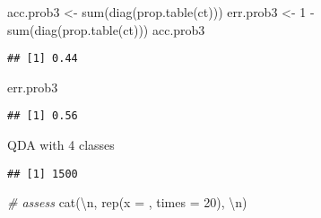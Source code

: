 \documentclass[
]{article}
\newenvironment{Shaded}{\begin{snugshade}}{\end{snugshade}}
\newcommand{\AttributeTok}[1]{\textcolor[rgb]{0.77,0.63,0.00}{#1}}
\newcommand{\CommentTok}[1]{\textcolor[rgb]{0.56,0.35,0.01}{\textit{#1}}}
\newcommand{\DecValTok}[1]{\textcolor[rgb]{0.00,0.00,0.81}{#1}}
\newcommand{\FunctionTok}[1]{\textcolor[rgb]{0.00,0.00,0.00}{#1}}
\newcommand{\NormalTok}[1]{#1}
\newcommand{\OtherTok}[1]{\textcolor[rgb]{0.56,0.35,0.01}{#1}}
\newcommand{\SpecialCharTok}[1]{\textcolor[rgb]{0.00,0.00,0.00}{#1}}
\newcommand{\StringTok}[1]{\textcolor[rgb]{0.31,0.60,0.02}{#1}}
\begin{document}
\begin{Shaded}
\begin{Highlighting}[]
\NormalTok{acc.prob3 }\OtherTok{\textless{}{-}} \FunctionTok{sum}\NormalTok{(}\FunctionTok{diag}\NormalTok{(}\FunctionTok{prop.table}\NormalTok{(ct)))}
\NormalTok{err.prob3 }\OtherTok{\textless{}{-}} \DecValTok{1} \SpecialCharTok{{-}} \FunctionTok{sum}\NormalTok{(}\FunctionTok{diag}\NormalTok{(}\FunctionTok{prop.table}\NormalTok{(ct)))}
\NormalTok{acc.prob3}
\end{Highlighting}
\end{Shaded}

\begin{verbatim}
## [1] 0.44
\end{verbatim}

\begin{Shaded}
\begin{Highlighting}[]
\NormalTok{err.prob3}
\end{Highlighting}
\end{Shaded}

\begin{verbatim}
## [1] 0.56
\end{verbatim}

QDA with 4 classes

\begin{Shaded}
\end{Shaded}

\begin{verbatim}
## [1] 1500
\end{verbatim}

\begin{Shaded}
\begin{Highlighting}[]
\CommentTok{\# assess}
\FunctionTok{cat}\NormalTok{(}\StringTok{\textquotesingle{}}\SpecialCharTok{\textbackslash{}n}\StringTok{\textquotesingle{}}\NormalTok{, }\FunctionTok{rep}\NormalTok{(}\AttributeTok{x =} \StringTok{\textquotesingle{}{-}\textquotesingle{}}\NormalTok{, }\AttributeTok{times =} \DecValTok{20}\NormalTok{), }\StringTok{\textquotesingle{}}\SpecialCharTok{\textbackslash{}n}\StringTok{\textquotesingle{}}\NormalTok{)}
\end{Highlighting}
\end{Shaded}
\end{document}
